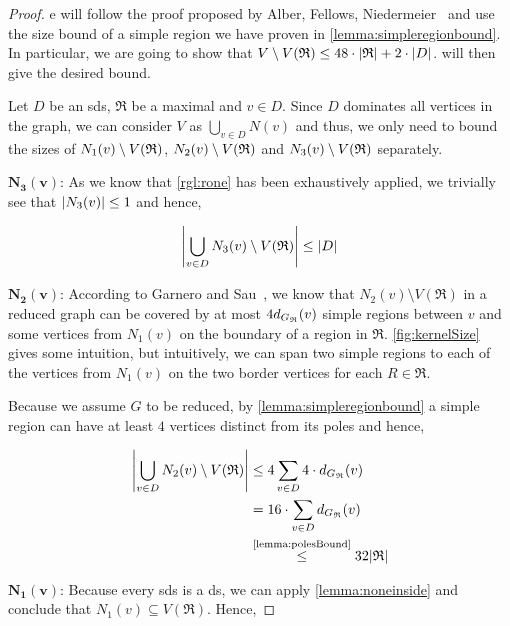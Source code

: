 \begin{proof}
    e will follow the proof proposed by Alber, Fellows, Niedermeier~\cite[Proposition 2]{Alber2004} and use the size bound of a simple region we have proven in \cref{lemma:simpleregionbound}. 
    In particular, we are going to show that $V \setminus V(\mathfrak{R}) \leq 48 \cdot \abs{\mathfrak{R}} + 2 \cdot \abs{D}$.  will then give the desired bound.
    
    Let $D$ be an sds, $\mathfrak{R}$ be a maximal \dreg and $v \in D$. Since $D$ dominates all vertices in the graph, we can consider $V$ as $\bigcup_{v \in D}N(v)$ and thus, we only need to bound the sizes of $N_1(v)\setminus {V(\mathfrak{R})} $, $N_2(v) \setminus {V(\mathfrak{R})} $ and $N_3(v) \setminus {V(\mathfrak{R})} $ separately.
    
    \noindent$\mathbf{N_3(v)}$: As we know that \cref{rgl:rone} has been exhaustively applied, we trivially see that $\abs{N_3(v)} \leq 1$ and hence, 
    
    \[\abs{\bigcup_{v \in D}N_3(v) \setminus V(\mathfrak{R})} \leq \abs{D}\]
    
    \noindent$\mathbf{N_2(v)}$: According to Garnero and Sau~\cite[Proposition 2]{Garnero2018}, we know that $N_2(v) \setminus V(\mathfrak{R})$ in a reduced graph can be covered by at most $4 d_{G_{\mathfrak{R}}}(v)$ simple regions between $v$ and some vertices from $N_1(v)$ on the boundary of a region in $\mathfrak{R}$. 
    \cref{fig:kernelSize} gives some intuition, but intuitively, we can span two simple regions to each of the vertices from $N_1(v)$ on the two border vertices for each $R \in \mathfrak{R}$.
    
    Because we assume $G$ to be reduced, by \cref{lemma:simpleregionbound} a simple region can have at least $4$ vertices distinct from its poles and hence,
    
    \begin{equation}
        \begin{split}
            \abs{\bigcup_{v \in D} N_2(v) \setminus V(\mathfrak{R})} &\leq 4 \sum_{v \in D}4 \cdot \dGR(v) \\
            &= 16 \cdot \sum_{v \in D}\dGR(v) \\
            &\overset{\text{\cref{lemma:polesBound}}}{\leq} 32 \abs{\mathfrak{R}}
        \end{split}
    \end{equation}
    
    \noindent$\mathbf{N_1(v)}$: Because every sds is a ds, we can apply \cref{lemma:noneinside} and conclude that $N_1(v) \subseteq V(\mathfrak{R})$. 
    Hence,
    

\end{proof}
